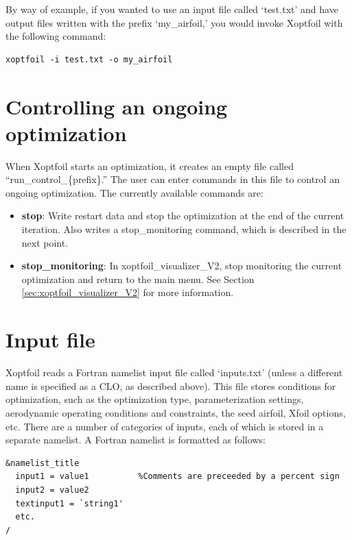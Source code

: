 \documentclass[11pt]{article}
\begin{document}
By way of example, if you wanted to use an input file called `test.txt' and have output
files written with the prefix `my\_airfoil,' you would invoke Xoptfoil with the following
command:

\begin{verbatim}
xoptfoil -i test.txt -o my_airfoil
\end{verbatim}

\section{Controlling an ongoing optimization}\label{sec:run_control}

When Xoptfoil starts an optimization, it creates an empty file called
``run\_control\_\{prefix\}.'' The user can enter commands in this file to control an ongoing
optimization. The currently available commands are:

\begin{itemize}
\item{\textbf{stop}: Write restart data and stop the optimization at the end of the
current iteration. Also writes a stop\_monitoring command, which is described in the next
point.}
\item{\textbf{stop\_monitoring}: In xoptfoil\_visualizer\_V2, stop monitoring the current
optimization and return to the main menu. See Section \ref{sec:xoptfoil_visualizer_V2} for
more information.}
\end{itemize}

\section{Input file}

Xoptfoil reads a Fortran namelist input file called `inputs.txt' (unless a different name
is specified as a CLO, as described above).  This file stores
conditions for optimization, such as the optimization type, parameterization settings,
aerodynamic operating conditions and constraints, the seed airfoil, Xfoil options, etc.
There are a number of categories of inputs, each of which is stored in a separate
namelist.  A Fortran namelist is formatted as follows:

\begin{verbatim}
&namelist_title
  input1 = value1          %Comments are preceeded by a percent sign
  input2 = value2
  textinput1 = `string1'
  etc.
/
\end{verbatim}
\end{document}
